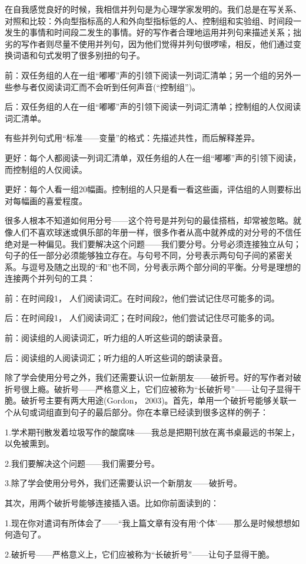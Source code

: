 在自我感觉良好的时候，我相信并列句是为心理学家发明的。我们总是在写关系、对照和比较：外向型指标高的人和外向型指标低的人、控制组和实验组、时间段一发生的事情和时间段二发生的事情。好的写作者合理地运用并列句来描述关系；拙劣的写作者则尽量不使用并列句，因为他们觉得并列句很啰嗦，相反，他们通过变换词语和句式发明了很多别扭的句子。

{\kaishu 前：双任务组的人在一组“嘟嘟”声的引领下阅读一列词汇清单；另一个组的另外一些参与者仅阅读词汇而不会听到任何声音(“控制组”)。

后：双任务组的人在一组“嘟嘟”声的引领下阅读一列词汇清单；控制组的人仅阅读词汇清单。}

有些并列句式用“标准——变量”的格式：先描述共性，而后解释差异。

{\kaishu 更好：每个人都阅读一列词汇清单，双任务组的人在一组“嘟嘟”声的引领下阅读，而控制组的人仅阅读。

更好：每个人看一组20幅画。控制组的人只是看一看这些画，评估组的人则要标出对每幅画的喜爱程度。}

很多人根本不知道如何用分号——这个符号是并列句的最佳搭档，却常被忽略。就像人们不喜欢球迷或俱乐部的年册一样，很多作者从高中就养成的对分号的不信任绝对是一种偏见。我们要解决这个问题——我们要分号。分号必须连接独立从句；句子的任一部分必须能够独立存在。与句号不同，分号表示两句句子间的紧密关系。与逗号及随之出现的“和”也不同，分号表示两个部分间的平衡。分号是理想的连接两个并列句的工具：

{\kaishu 前：在时间段1， 人们阅读词汇。在时间段2，他们尝试记住尽可能多的词。

后：在时间段1， 人们阅读词汇；在时间段2，他们尝试记住尽可能多的词。

前：阅读组的人阅读词汇，听力组的人听这些词的朗读录音。

后：阅读组的人阅读词汇；听力组的人听这些词的朗读录音。}

除了学会使用分号之外，我们还需要认识一位新朋友——破折号。好的写作者对破折号很上瘾。破折号——严格意义上，它们应被称为“长破折号”——让句子显得干脆。破折号主要有两大用途(Gordon， 2003)。首先，单用一个破折号能够关联一个从句或词组直到句子的最后部分。你在本章已经读到很多这样的例子：

{\kaishu 1.学术期刊散发着垃圾写作的酸腐味——我总是把期刊放在离书桌最远的书架上，以免被熏到。

2.我们要解决这个问题——我们需要分号。

3.除了学会使用分号外，我们还需要认识一个新朋友——破折号。}

其次，用两个破折号能够连接插入语。比如你前面读到的：

{\kaishu 1.现在你对遣词有所体会了——“我上篇文章有没有用‘个体’——那么是时候想想如何造句了。

2.破折号——严格意义上，它们应被称为“长破折号”——让句子显得干脆。}

